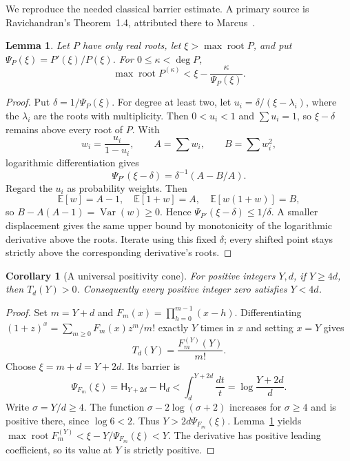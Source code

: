 \documentclass[11pt,a4paper]{article}
\numberwithin{equation}{section}
\newtheorem{lemma}[theorem]{Lemma}
\newtheorem{corollary}[theorem]{Corollary}
\theoremstyle{definition}
\theoremstyle{remark}
\theoremstyle{plain}
\begin{document}
We reproduce the needed classical barrier estimate. A primary source is
Ravichandran's Theorem~1.4, attributed there to Marcus~\cite{xx-ravichandran}.

\begin{lemma}\label{xx:pm:barrier}
Let $P$ have only real roots, let $\xi>\max\operatorname{root}P$, and put
$\Psi_P(\xi)=P'(\xi)/P(\xi)$. For $0\le\kappa<\deg P$,
\[
 \max\operatorname{root}P^{(\kappa)}<\xi-\frac{\kappa}{\Psi_P(\xi)}.
\]
\end{lemma}
\begin{proof}
Put $\delta=1/\Psi_P(\xi)$. For degree at least two, let
$u_i=\delta/(\xi-\lambda_i)$, where the $\lambda_i$ are the roots with
multiplicity. Then $0<u_i<1$ and $\sum u_i=1$, so $\xi-\delta$ remains above
every root of $P$. With
\[
 w_i=\frac{u_i}{1-u_i},\qquad A=\sum w_i,\qquad B=\sum w_i^2,
\]
logarithmic differentiation gives
\[
 \Psi_{P'}(\xi-\delta)=\delta^{-1}(A-B/A).
\]
Regard the $u_i$ as probability weights. Then
\[
 \mathbb E[w]=A-1,\quad \mathbb E[1+w]=A,\quad
 \mathbb E[w(1+w)]=B,
\]
so $B-A(A-1)=\operatorname{Var}(w)\ge0$. Hence $\Psi_{P'}(\xi-\delta)\le1/\delta$.
A smaller displacement gives the same upper bound by monotonicity of the
logarithmic derivative above the roots. Iterate using this fixed $\delta$; every
shifted point stays strictly above the corresponding derivative's roots.
\end{proof}

\begin{corollary}[A universal positivity cone]\label{xx:pm:positive}
For positive integers $Y,d$, if $Y\ge4d$, then $T_d(Y)>0$. Consequently every
positive integer zero satisfies $Y<4d$.
\end{corollary}
\begin{proof}
Set $m=Y+d$ and $F_m(x)=\prod_{h=0}^{m-1}(x-h)$. Differentiating
$(1+z)^x=\sum_{m\ge0}F_m(x)z^m/m!$ exactly $Y$ times in $x$ and setting $x=Y$
gives
\begin{equation}\label{xx:pm:derivative}
 T_d(Y)=\frac{F_m^{(Y)}(Y)}{m!}.
\end{equation}
Choose $\xi=m+d=Y+2d$. Its barrier is
\[
 \Psi_{F_m}(\xi)=\mathsf H_{Y+2d}-\mathsf H_d
 <\int_d^{Y+2d}\frac{dt}{t}=\log\frac{Y+2d}{d}.
\]
Write $\sigma=Y/d\ge4$. The function $\sigma-2\log(\sigma+2)$ increases for
$\sigma\ge4$ and is positive there, since $\log6<2$. Thus
$Y>2d\Psi_{F_m}(\xi)$. Lemma~\ref{xx:pm:barrier} yields
$\max\operatorname{root}F_m^{(Y)}<\xi-Y/\Psi_{F_m}(\xi)<Y$.
The derivative has positive leading coefficient, so its value at $Y$ is
strictly positive.
\end{proof}
\end{document}
